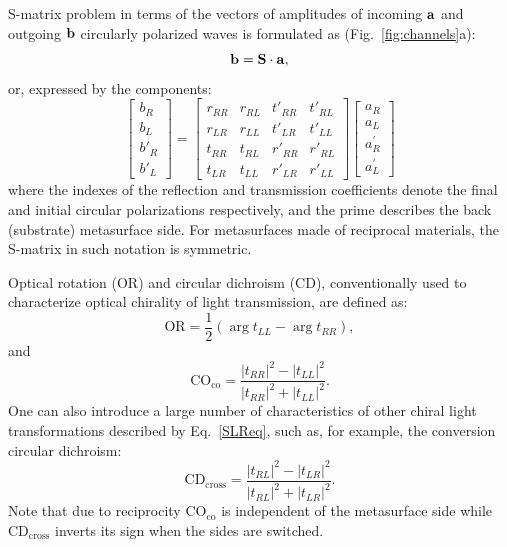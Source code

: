\documentclass[
    reprint,
    superscriptaddress,
    a4paper,
    amsmath,amssymb,
    prb,
]{revtex4-2}
\begin{document}
S-matrix problem in terms of the vectors of amplitudes of incoming $\bf a$ and outgoing $\bf b$ circularly polarized waves is formulated as (Fig.~\ref{fig:channels}a): 
\begin{equation}\label{Sxyvec}
	{\bf b}={\bf S}\cdot{\bf a},
\end{equation}
or, expressed by the components:
\begin{equation}\label{SLReq}
	\begin{bmatrix}
		b_R \\
		b_L \\
		b'_R \\
		b'_L
	\end{bmatrix}=
	\begin{bmatrix}
		r_{RR} & r_{RL} & t'_{RR} & t'_{RL}\\
		r_{LR} & r_{LL} & t'_{LR} & t'_{LL}\\
		t_{RR} & t_{RL} & r'_{RR} & r'_{RL}\\
		t_{LR} & t_{LL} & r'_{LR} & r'_{LL}
	\end{bmatrix}
	\begin{bmatrix}
		a_R \\
		a_L \\
		a^{\prime}_R \\
		a^{\prime}_L
	\end{bmatrix}
\end{equation}
where the indexes of the reflection and transmission coefficients denote the final and initial circular polarizations respectively, and the prime describes the back (substrate) metasurface side. For metasurfaces made of reciprocal materials, the S-matrix in such notation is symmetric.

Optical rotation ($\mathrm{OR}$) and circular dichroism ($\mathrm{CD}$), conventionally used to characterize optical chirality of light transmission, are defined as:
\begin{equation}
	\label{OR}
	\mathrm{OR} = \frac{1}{2}(\arg t_{LL} - \arg t_{RR}),
\end{equation}
and
\begin{equation}
	\label{CDco}
	\mathrm{CO}_{\text{co}} = \frac{|t_{RR}|^2 - |t_{LL}|^2}{|t_{RR}|^2 + |t_{LL}|^2}.
\end{equation}
One can also introduce a large number of characteristics of other chiral light transformations described by Eq.~\eqref{SLReq}, such as, for example, the conversion circular dichroism: 
\begin{equation}
	\label{CDcross}
	\mathrm{CD}_{\text{cross}} = \frac{|t_{RL}|^2 - |t_{LR}|^2}{|t_{RL}|^2 + |t_{LR}|^2}.
\end{equation}
Note that due to reciprocity $\mathrm{CO}_{\text{co}} $  is independent of the metasurface side while $\mathrm{CD}_{\text{cross}}$ inverts its sign when the sides are switched.
\end{document}
